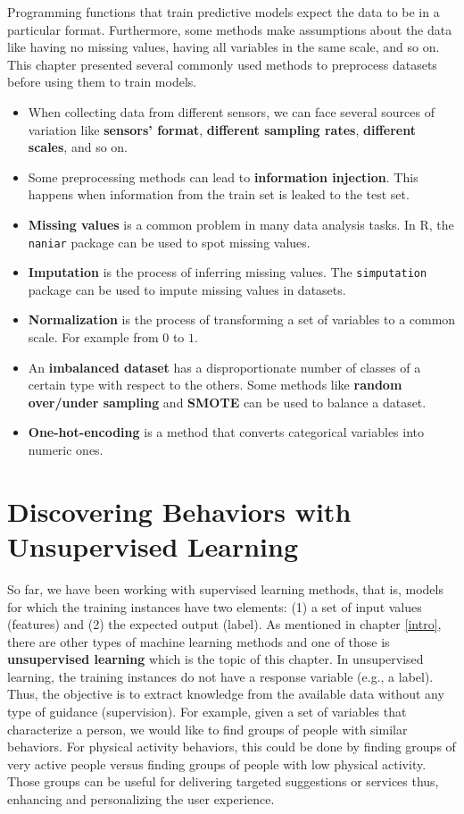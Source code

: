 \documentclass[
  11pt,
]{krantz}
\providecommand{\tightlist}{%
  \setlength{\itemsep}{0pt}\setlength{\parskip}{0pt}}
\begin{document}
Programming functions that train predictive models expect the data to be in a particular format. Furthermore, some methods make assumptions about the data like having no missing values, having all variables in the same scale, and so on. This chapter presented several commonly used methods to preprocess datasets before using them to train models.

\begin{itemize}
\tightlist
\item
  When collecting data from different sensors, we can face several sources of variation like \textbf{sensors' format}, \textbf{different sampling rates}, \textbf{different scales}, and so on.
\item
  Some preprocessing methods can lead to \textbf{information injection}. This happens when information from the train set is leaked to the test set.
\item
  \textbf{Missing values} is a common problem in many data analysis tasks. In R, the \texttt{naniar} package can be used to spot missing values.
\item
  \textbf{Imputation} is the process of inferring missing values. The \texttt{simputation} package can be used to impute missing values in datasets.
\item
  \textbf{Normalization} is the process of transforming a set of variables to a common scale. For example from \(0\) to \(1\).
\item
  An \textbf{imbalanced dataset} has a disproportionate number of classes of a certain type with respect to the others. Some methods like \textbf{random over/under sampling} and \textbf{SMOTE} can be used to balance a dataset.
\item
  \textbf{One-hot-encoding} is a method that converts categorical variables into numeric ones.
\end{itemize}

\hypertarget{unsupervised}{%
\chapter{Discovering Behaviors with Unsupervised Learning}\label{unsupervised}}

So far, we have been working with supervised learning methods, that is, models for which the training instances have two elements: (1) a set of input values (features) and (2) the expected output (label). As mentioned in chapter \ref{intro}, there are other types of machine learning methods and one of those is \textbf{unsupervised learning} which is the topic of this chapter. In unsupervised learning, the training instances do not have a response variable (e.g., a label). Thus, the objective is to extract knowledge from the available data without any type of guidance (supervision). For example, given a set of variables that characterize a person, we would like to find groups of people with similar behaviors. For physical activity behaviors, this could be done by finding groups of very active people versus finding groups of people with low physical activity. Those groups can be useful for delivering targeted suggestions or services thus, enhancing and personalizing the user experience.
\end{document}
